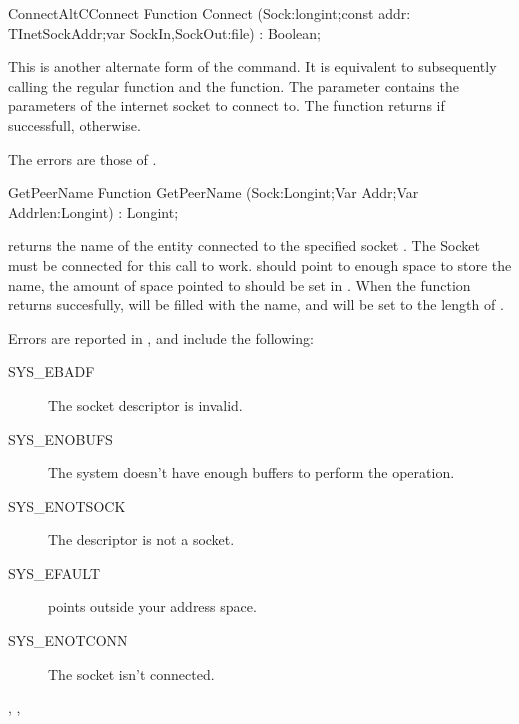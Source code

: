 \begin{functionl}{Connect}{AltCConnect}
\Declaration
Function Connect (Sock:longint;const addr: TInetSockAddr;var SockIn,SockOut:file) : Boolean;

\Description
 This is another alternate form of the  command. 
It is equivalent
to subsequently calling the regular  function and the 
 function. The  parameter contains the parameters
of the internet socket to connect to.
The function returns  if successfull,  otherwise.

\Errors
The errors are those of .
\SeeAlso
{}
\end{functionl}
\latex{}
\html{}
\begin{function}{GetPeerName}
\Declaration
Function GetPeerName (Sock:Longint;Var Addr;Var Addrlen:Longint) : Longint;

\Description
{} returns the name of the entity connected to the 
specified socket . The Socket must be connected for this call to
work. 
 should point to enough space to store the name, the
amount of space pointed to should be set in . 
When the function returns succesfully,  will be filled with the 
name, and  will be set to the length of .

\Errors
Errors are reported in , and include the following:
\begin{description}
\item[SYS\_EBADF] The socket descriptor is invalid.
\item[SYS\_ENOBUFS] The system doesn't have enough buffers to perform the
operation.
\item[SYS\_ENOTSOCK] The descriptor is not a socket.
\item[SYS\_EFAULT]  points outside your address space.
\item[SYS\_ENOTCONN] The socket isn't connected.
\end{description}

\SeeAlso
{}, , 
\end{function}
